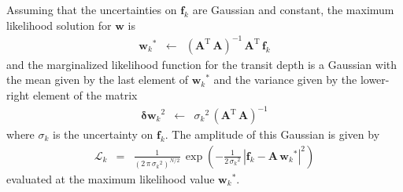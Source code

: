 \documentclass[12pt,preprint]{aastex}
\newcommand{\eqlabel}[1]{\label{eq:#1}}
\newcommand{\T}{\ensuremath{\mathrm{T}}}
\newcommand{\bvec}[1]{{\ensuremath{\boldsymbol{#1}}}}
\begin{document}
Assuming that the uncertainties on $\bvec{f}_k$ are Gaussian and constant,
the maximum likelihood solution for \bvec{w} is
\begin{eqnarray}
{\bvec{w}_k}^* &\gets& \left( \bvec{A}^\T\,\bvec{A} \right)^{-1}\,
                       \bvec{A}^\T\,\bvec{f}_k
\end{eqnarray}
and the marginalized likelihood function for the transit depth is a Gaussian
with the mean given by the last element of ${\bvec{w}_k}^*$ and the variance
given by the lower-right element of the matrix
\begin{eqnarray}
{\bvec{\delta w}_k}^2 &\gets& {\sigma_k}^2 \,
            \left( \bvec{A}^\T\,\bvec{A} \right)^{-1}
\end{eqnarray}
where $\sigma_k$ is the uncertainty on $\bvec{f}_k$.
The amplitude of this Gaussian is given by
\begin{eqnarray}\eqlabel{depth-likelihood}
\mathcal{L}_k &=& \frac{1}{(2\,\pi\,{\sigma_k}^2)^{N/2}}\,\exp\left(
-\frac{1}{2\,{\sigma_k}^2}\,
\left| \bvec{f}_k - \bvec{A}\,{\bvec{w}_k}^* \right|^2
\right)
\end{eqnarray}
evaluated at the maximum likelihood value ${\bvec{w}_k}^*$.


\clearpage

\clearpage
\end{document}
